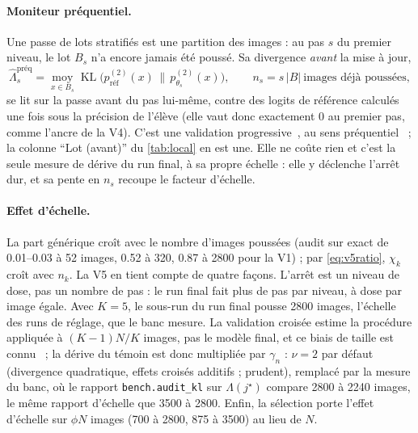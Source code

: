 \documentclass[11pt,a4paper]{article}
\newcommand{\KL}{\operatorname{KL}}
\newcommand{\Exp}{\operatorname*{moy}}
\newcommand{\code}[1]{\texttt{#1}}
\begin{document}
\paragraph{Moniteur préquentiel.} Une passe de lots stratifiés est une partition des images : au pas
$s$ du premier niveau, le lot $B_s$ n'a encore jamais été poussé. Sa divergence \emph{avant} la mise à
jour,
\begin{equation}\label{eq:v5preq}
  \hat\Lambda^{\text{préq}}_s=\Exp_{x\in B_s}\KL\bigl(p^{(2)}_{\text{réf}}(x)\,\|\,p^{(2)}_{\theta_s}(x)\bigr),
  \qquad n_s=s\,|B|\ \text{images déjà poussées},
\end{equation}
se lit sur la passe avant du pas lui-même, contre des logits de référence calculés une fois sous la
précision de l'élève (elle vaut donc exactement 0 au premier pas, comme l'ancre de la V4). C'est une
validation progressive~\cite{blum1999beating}, au sens préquentiel~\cite{dawid1984prequential} ; la
colonne \enquote{Lot (avant)} du \cref{tab:local} en est une. Elle ne coûte rien et c'est la seule
mesure de dérive du run final, à sa propre échelle : elle y déclenche l'arrêt dur, et sa pente en $n_s$
recoupe le facteur d'échelle.

\paragraph{Effet d'échelle.} La part générique croît avec le nombre d'images poussées (audit sur exact
de \numrange{0.01}{0.03} à 52 images, \num{0.52} à 320, \num{0.87} à 2800 pour la V1) ; par
\eqref{eq:v5ratio}, $\chi_k$ croît avec $n_k$. La V5 en tient compte de quatre façons. L'arrêt est un
niveau de dose, pas un nombre de pas : le run final fait plus de pas par niveau, à dose par image
égale. Avec $K=5$, le sous-run du run final pousse 2800 images, l'échelle des runs de réglage, que le
banc mesure. La validation croisée estime la procédure appliquée à $(K-1)N/K$ images, pas le
modèle final, et ce biais de taille est connu~\cite{bates2024cv} ; la dérive du témoin est donc
multipliée par $\gamma_n$ : $\nu=2$ par défaut (divergence quadratique, effets croisés additifs ;
prudent), remplacé par la mesure du banc, où le rapport \code{bench.audit\_kl} sur $\Lambda(j^\star)$
compare 2800 à 2240 images, le même rapport d'échelle que 3500 à 2800. Enfin, la sélection porte
l'effet d'échelle sur $\phi N$ images (700 à 2800, 875 à 3500) au lieu de $N$.
\end{document}
